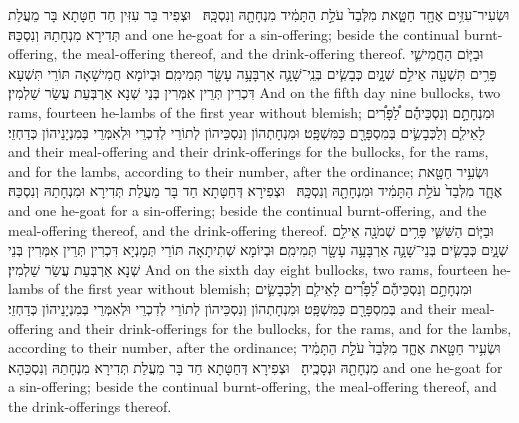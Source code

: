 {וּשְׂעִיר־עִזִּ֥ים אֶחָ֖ד חַטָּ֑את מִלְּבַד֙ עֹלַ֣ת הַתָּמִ֔יד מִנְחָתָ֖הּ וְנִסְכָּֽהּ׃ \setuma }
{וּצְפִיר בַּר עִזִּין חַד חַטָּתָא בָּר מֵעֲלַת תְּדִירָא מִנְחָתַהּ וְנִסְכַּהּ׃}
{and one he-goat for a sin-offering; beside the continual burnt-offering, the meal-offering thereof, and the drink-offering thereof.}{}
{וּבַיּ֧וֹם הַחֲמִישִׁ֛י פָּרִ֥ים תִּשְׁעָ֖ה אֵילִ֣ם שְׁנָ֑יִם כְּבָשִׂ֧ים בְּנֵֽי־שָׁנָ֛ה אַרְבָּעָ֥ה עָשָׂ֖ר תְּמִימִֽם׃}
{וּבְיוֹמָא חֲמִישָׁאָה תּוֹרֵי תִּשְׁעָא דִּכְרִין תְּרֵין אִמְּרִין בְּנֵי שְׁנָא אַרְבְּעַת עֲשַׂר שַׁלְמִין׃}
{And on the fifth day nine bullocks, two rams, fourteen he-lambs of the first year without blemish;}{}
{וּמִנְחָתָ֣ם וְנִסְכֵּיהֶ֡ם לַ֠פָּרִ֠ים לָאֵילִ֧ם וְלַכְּבָשִׂ֛ים בְּמִסְפָּרָ֖ם כַּמִּשְׁפָּֽט׃}
{וּמִנְחָתְהוֹן וְנִסְכֵּיהוֹן לְתוֹרֵי לְדִכְרֵי וּלְאִמְּרֵי בְּמִנְיָנֵיהוֹן כְּדַחְזֵי׃}
{and their meal-offering and their drink-offerings for the bullocks, for the rams, and for the lambs, according to their number, after the ordinance;}{}
{וּשְׂעִ֥יר חַטָּ֖את אֶחָ֑ד מִלְּבַד֙ עֹלַ֣ת הַתָּמִ֔יד וּמִנְחָתָ֖הּ וְנִסְכָּֽהּ׃ \setuma }
{וּצְפִירָא דְּחַטָּתָא חַד בָּר מֵעֲלַת תְּדִירָא וּמִנְחָתַהּ וְנִסְכַּהּ׃}
{and one he-goat for a sin-offering; beside the continual burnt-offering, and the meal-offering thereof, and the drink-offering thereof.}{}
{וּבַיּ֧וֹם הַשִּׁשִּׁ֛י פָּרִ֥ים שְׁמֹנָ֖ה אֵילִ֣ם שְׁנָ֑יִם כְּבָשִׂ֧ים בְּנֵי־שָׁנָ֛ה אַרְבָּעָ֥ה עָשָׂ֖ר תְּמִימִֽם׃}
{וּבְיוֹמָא שְׁתִיתָאָה תּוֹרֵי תְּמָנְיָא דִּכְרִין תְּרֵין אִמְּרִין בְּנֵי שְׁנָא אַרְבְּעַת עֲשַׂר שַׁלְמִין׃}
{And on the sixth day eight bullocks, two rams, fourteen he-lambs of the first year without blemish;}{}
{וּמִנְחָתָ֣ם וְנִסְכֵּיהֶ֡ם לַ֠פָּרִ֠ים לָאֵילִ֧ם וְלַכְּבָשִׂ֛ים בְּמִסְפָּרָ֖ם כַּמִּשְׁפָּֽט׃}
{וּמִנְחָתְהוֹן וְנִסְכֵּיהוֹן לְתוֹרֵי לְדִכְרֵי וּלְאִמְּרֵי בְּמִנְיָנֵיהוֹן כְּדַחְזֵי׃}
{and their meal-offering and their drink-offerings for the bullocks, for the rams, and for the lambs, according to their number, after the ordinance;}{}
{וּשְׂעִ֥יר חַטָּ֖את אֶחָ֑ד מִלְּבַד֙ עֹלַ֣ת הַתָּמִ֔יד מִנְחָתָ֖הּ וּנְסָכֶֽיהָ׃ \setuma }
{וּצְפִירָא דְּחַטָּתָא חַד בָּר מֵעֲלַת תְּדִירָא מִנְחָתַהּ וְנִסְכַּהָא׃}
{and one he-goat for a sin-offering; beside the continual burnt-offering, the meal-offering thereof, and the drink-offerings thereof.}{}

